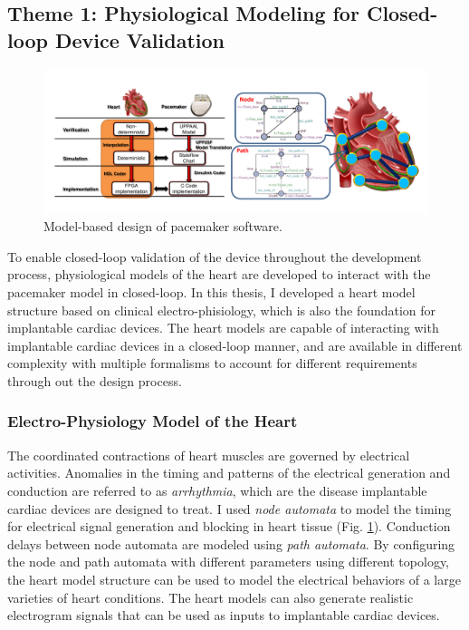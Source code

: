 \documentclass[a4paper]{article}
\begin{document}
\subsection{Theme 1: Physiological Modeling for Closed-loop Device Validation}
\begin{figure}[t]
	\centering
	\includegraphics[scale=0.32]{figs/mb_heart.pdf}
	\caption{\small Model-based design of pacemaker software.}
	\label{fig:mb_heart}
\end{figure}
To enable closed-loop validation of the device throughout the development process, physiological models of the heart are developed to interact with the pacemaker model in closed-loop. 
In this thesis, I developed a heart model structure based on clinical electro-phisiology, which is also the foundation for implantable cardiac devices.
The heart models are capable of interacting with implantable cardiac devices in a closed-loop manner, and are available in different complexity with multiple formalisms to account for different requirements through out the design process.
\subsubsection{Electro-Physiology Model of the Heart}
The coordinated contractions of heart muscles are governed by electrical activities.
Anomalies in the timing and patterns of the electrical generation and conduction are referred to as \emph{arrhythmia}, which are the disease implantable cardiac devices are designed to treat.
I used \emph{node automata} to model the timing for electrical signal generation and blocking in heart tissue (Fig. \ref{fig:mb_heart}).
Conduction delays between node automata are modeled using \emph{path automata}.
By configuring the node and path automata with different parameters using different topology, the heart model structure can be used to model the electrical behaviors of a large varieties of heart conditions. 
The heart models can also generate realistic electrogram signals that can be used as inputs to implantable cardiac devices.
\end{document}
